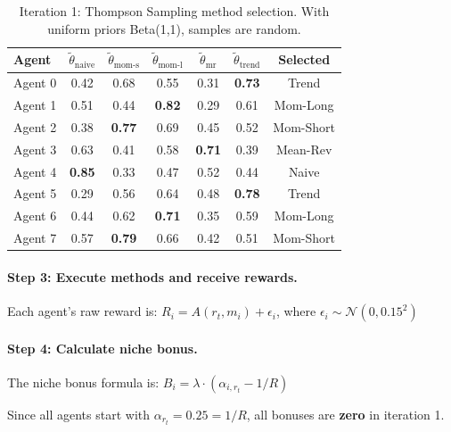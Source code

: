\begin{table}[h]
\centering
\small
\caption{Iteration 1: Thompson Sampling method selection. With uniform priors Beta(1,1), samples are random.}
\begin{tabular}{l|ccccc|c}
\toprule
\textbf{Agent} & $\tilde{\theta}_{\text{naive}}$ & $\tilde{\theta}_{\text{mom-s}}$ & $\tilde{\theta}_{\text{mom-l}}$ & $\tilde{\theta}_{\text{mr}}$ & $\tilde{\theta}_{\text{trend}}$ & \textbf{Selected} \\
\midrule
Agent 0 & 0.42 & 0.68 & 0.55 & 0.31 & \textbf{0.73} & Trend \\
Agent 1 & 0.51 & 0.44 & \textbf{0.82} & 0.29 & 0.61 & Mom-Long \\
Agent 2 & 0.38 & \textbf{0.77} & 0.69 & 0.45 & 0.52 & Mom-Short \\
Agent 3 & 0.63 & 0.41 & 0.58 & \textbf{0.71} & 0.39 & Mean-Rev \\
Agent 4 & \textbf{0.85} & 0.33 & 0.47 & 0.52 & 0.44 & Naive \\
Agent 5 & 0.29 & 0.56 & 0.64 & 0.48 & \textbf{0.78} & Trend \\
Agent 6 & 0.44 & 0.62 & \textbf{0.71} & 0.35 & 0.59 & Mom-Long \\
Agent 7 & 0.57 & \textbf{0.79} & 0.66 & 0.42 & 0.51 & Mom-Short \\
\bottomrule
\end{tabular}
\end{table}

\paragraph{Step 3: Execute methods and receive rewards.}

Each agent's raw reward is: $R_i = A(r_t, m_i) + \epsilon_i$, where $\epsilon_i \sim \mathcal{N}(0, 0.15^2)$

\paragraph{Step 4: Calculate niche bonus.}

The niche bonus formula is: $B_i = \lambda \cdot (\alpha_{i,r_t} - 1/R)$

Since all agents start with $\alpha_{r_t} = 0.25 = 1/R$, all bonuses are \textbf{zero} in iteration 1.

